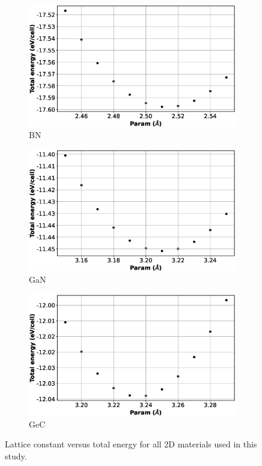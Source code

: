 \begin{figure}[htb]
\begin{subfigure}{0.45\textwidth}
  \includegraphics[width=\linewidth]{images/bn_2d_opt.eps}
  \caption{BN}
\end{subfigure}\hfil %
\begin{subfigure}{0.45\textwidth}
  \includegraphics[width=\linewidth]{images/gan_2d_opt.eps}
  \caption{GaN}
\end{subfigure}

\medskip
\begin{subfigure}{0.45\textwidth}
  \includegraphics[width=\linewidth]{images/gec_2d_opt.eps}
  \caption{GeC}
\end{subfigure}

\medskip


\caption{Lattice constant versus total energy for all 2D materials used in this study.}
\label{fig:2d_opt}
\end{figure}



